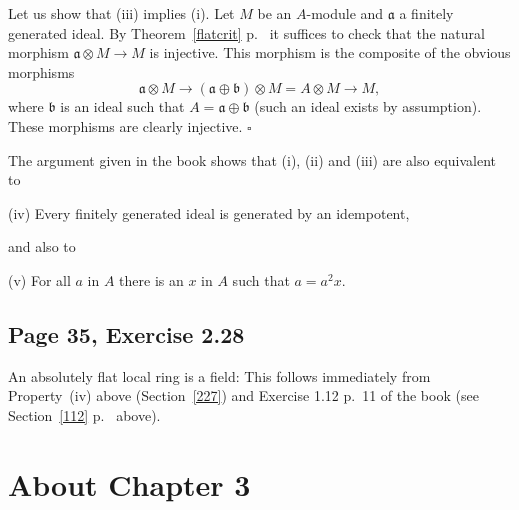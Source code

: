 \documentclass[parskip=half,fontsize=12pt]{scrartcl}%
\newcommand{\mf}{\mathfrak}
\newcommand{\aaa}{\mf a}
\newcommand{\bbb}{\mf b}
\begin{document}
\begin{comment}
To show that (i) implies (ii), let $x$ be in $A$ and consider the obvious diagram
$$
(x)\otimes A\to(x)\otimes A/(x)\to A\otimes A/(x)\to A/(x). 
$$ 
(We again write $\otimes$ for $\otimes_A$.) The first map is surjective, the second map is injective by flatness of $A/(x)$, the third map is bijective and the composition vanishes. This implies $(x)\otimes A/(x)=0$. The sequence 
$$
0\to(x)\otimes(x)\to(x)\otimes A\to(x)\otimes A/(x)\to0
$$ 
is exact by flatness of $(x)$. But this sequence can also be written as 
$$
0\to(x)\otimes(x)\to(x)\to0\to0.
$$ 
This proves that $(x)=(x^2)$, and thus that (i) implies (ii). $\square$
\end{comment}

Let us show that (iii) implies (i). Let $M$ be an $A$-module and $\aaa$ a finitely generated ideal. By Theorem~\ref{flatcrit} p.~\pageref{flatcrit} it suffices to check that the natural morphism $\aaa\otimes M\to M$ is injective. This morphism is the composite of the obvious morphisms 
$$
\aaa\otimes M\to(\aaa\oplus\bbb)\otimes M=A\otimes M\to M,
$$ 
where $\bbb$ is an ideal such that $A=\aaa\oplus\bbb$ (such an ideal exists by assumption). These morphisms are clearly injective. $\square$ 

The argument given in the book shows that (i), (ii) and (iii) are also equivalent to

(iv) Every finitely generated ideal is generated by an idempotent,

and also to 

(v) For all $a$ in $A$ there is an $x$ in $A$ such that $a=a^2x$.

\subsection{Page 35, Exercise 2.28}\label{228}%

An absolutely flat local ring is a field: This follows immediately from Property~(iv) above (Section~\ref{227}) and Exercise 1.12 p.~11 of the book (see Section~\ref{112} p.~\pageref{112} above). %

\section{About Chapter 3}%
\end{document}

